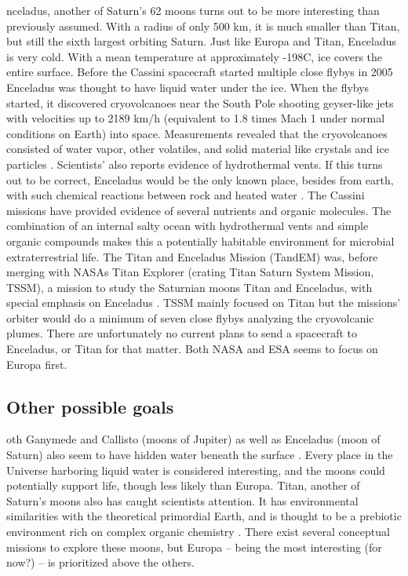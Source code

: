 \begin{multicols}{2}

 
nceladus, another of Saturn’s 62 moons turns out to be more interesting than previously assumed.
With a radius of only 500 km, it is much smaller than Titan, but still the sixth largest orbiting Saturn.
Just like Europa and Titan, Enceladus is very cold.
With a mean temperature at approximately -198\degree C, ice covers the entire surface.
Before the Cassini spacecraft started multiple close flybys in 2005 Enceladus was thought to have liquid water under the ice.
When the flybys started, it discovered cryovolcanoes near the South Pole shooting geyser-like jets with velocities up to 2189 km/h (equivalent to 1.8 times Mach 1 under normal conditions on Earth) into space.
Measurements revealed that the cryovolcanoes consisted of water vapor, other volatiles, and solid material like crystals and ice particles \cite{Enceladus1}.
Scientists’ also reports evidence of hydrothermal vents.
If this turns out to be correct, Enceladus would be the only known place, besides from earth, with such chemical reactions between rock and heated water \cite{FPlan09}.
The Cassini missions have provided evidence of several nutrients and organic molecules.
The combination of an internal salty ocean with hydrothermal vents and simple organic compounds makes this a potentially habitable environment for microbial extraterrestrial life.
The Titan and Enceladus Mission (TandEM) was, before merging with NASAs Titan Explorer (crating Titan Saturn System Mission, TSSM), a mission to study the Saturnian moons Titan and Enceladus, with special emphasis on Enceladus \cite{FPlan11}.
TSSM mainly focused on Titan but the missions’ orbiter would do a minimum of seven close flybys analyzing the cryovolcanic plumes.
There are unfortunately no current plans to send a spacecraft to Enceladus, or Titan for that matter.
Both NASA and ESA seems to focus on Europa first.
\fi

\subsection{Other possible goals}

oth Ganymede and Callisto (moons of Jupiter) as well as Enceladus (moon of Saturn) also seem to have hidden water beneath the surface \cite{FPlan09}.
Every place in the Universe harboring liquid water is considered interesting, and the moons could potentially support life, though less likely than Europa.
Titan, another of Saturn’s moons also has caught scientists attention.
It has environmental similarities with the theoretical primordial Earth, and is thought to be a prebiotic environment rich on complex organic chemistry \cite{RichOrganics}.
There exist several conceptual missions to explore these moons, but Europa – being the most interesting (for now?) – is prioritized above the others.


\end{multicols}
